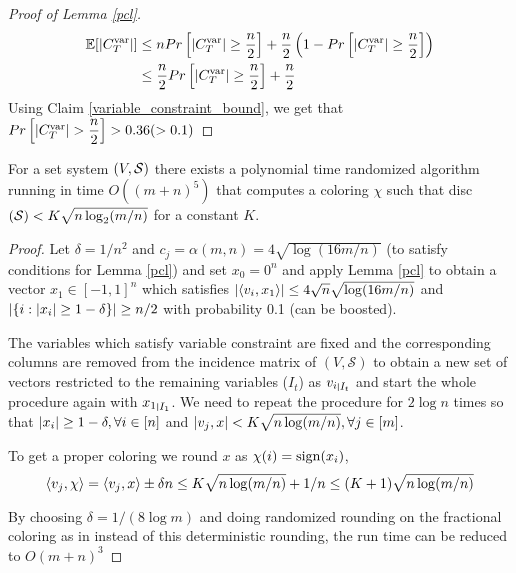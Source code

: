 \begin{proof}[Proof of Lemma \ref{pcl}]
\begin{align*}
  \mathbb{E}[\left\lvert C^{\mathrm{var}}_T \right\rvert]
&\leq nPr\left[\left\lvert C^{\mathrm{var}}_T \right\rvert \geq \dfrac{n}{2}\right] + \dfrac{n}{2}\left(1- Pr\left[\left\lvert C^{\mathrm{var}}_T \right\rvert \geq \dfrac{n}{2}\right] \right )\\
&\leq \dfrac{n}{2}Pr\left[\left\lvert C^{\mathrm{var}}_T \right\rvert \geq \dfrac{n}{2}\right]  + \dfrac{n}{2}
\end{align*}
Using Claim \ref{variable_constraint_bound}, we get that $Pr\left[\left\lvert C^{\mathrm{var}}_T \right\rvert > \dfrac{n}{2}\right] > 0.36 (> 0.1)$
\end{proof}

\begin{theorem}
For a set system $\left(V,\mathcal{S} \right )$ there exists a polynomial time randomized algorithm running in time $O((m+n)^5)$ that computes a coloring $\chi$ such that disc$\left(\mathcal{S} \right ) < K\sqrt{n\log_2(m/n)}$ for a constant $K$.
\end{theorem}
\begin{proof}
Let $\delta = 1/n^2$ and $c_j = \alpha(m,n) = 4 \sqrt{\log(16m/n)}$ (to satisfy conditions for Lemma \ref{pcl}) and set $x_0 =0^n$ and apply Lemma \ref{pcl} to obtain a vector $x_1 \in [-1,1]^n$ which satisfies
$\left\lvert \left\langle v_i,x_1\right\rangle \right\rvert \leq 4\sqrt{n}\sqrt{\log(16m/n)}$ and $\left\lvert \left\{i: \left\lvert x_i \right\rvert \geq 1 - \delta\right\} \right\rvert \geq n/2$ with probability 0.1 (can be boosted).\par
The variables which satisfy variable constraint are fixed and the corresponding columns are removed from the incidence matrix of $(V,\mathcal{S})$ to obtain a new set of vectors restricted to the remaining variables ($I_t$) as ${v_i}_{\mkern 1mu \vrule height 1ex\mkern2mu {I_t}}$ and start the whole procedure again with ${x_1}_{\mkern 1mu \vrule height 1ex\mkern2mu {I_1}}$.
We need to repeat the procedure for $2\log n$ times so that $\left\lvert x_i \right\rvert \geq 1- \delta, \forall i \in [n]$ and $\left\lvert v_j,x \right\rvert < K\sqrt{n\log(m/n)}, \forall j \in [m]$.

To get a proper coloring we round $x$ as $\chi(i) = \operatorname{sign}(x_i) $,
\[ \left\langle v_j,\chi\right\rangle = \left\langle v_j,x\right\rangle \pm \delta n \leq K\sqrt{n\log(m/n)} + 1/n \leq (K+1)\sqrt{n\log(m/n)} \]

By choosing $\delta = 1/(8 \log m)$ and doing randomized rounding on the fractional coloring as in \cite{12lovettmeka} instead of this deterministic rounding, the run time can be reduced to $O(m+n)^3$
\end{proof}
